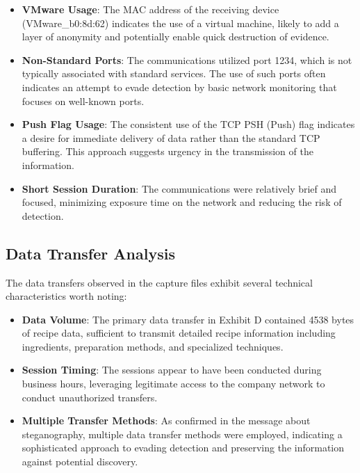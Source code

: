 \begin{itemize}
    \item \textbf{VMware Usage}: The MAC address of the receiving device (VMware\_b0:8d:62) indicates the use of a virtual machine, likely to add a layer of anonymity and potentially enable quick destruction of evidence.
    
    \item \textbf{Non-Standard Ports}: The communications utilized port 1234, which is not typically associated with standard services. The use of such ports often indicates an attempt to evade detection by basic network monitoring that focuses on well-known ports.
    
    \item \textbf{Push Flag Usage}: The consistent use of the TCP PSH (Push) flag indicates a desire for immediate delivery of data rather than the standard TCP buffering. This approach suggests urgency in the transmission of the information.
    
    \item \textbf{Short Session Duration}: The communications were relatively brief and focused, minimizing exposure time on the network and reducing the risk of detection.
\end{itemize}

\subsection{Data Transfer Analysis}
The data transfers observed in the capture files exhibit several technical characteristics worth noting:

\begin{itemize}
    \item \textbf{Data Volume}: The primary data transfer in Exhibit D contained 4538 bytes of recipe data, sufficient to transmit detailed recipe information including ingredients, preparation methods, and specialized techniques.
    
    \item \textbf{Session Timing}: The sessions appear to have been conducted during business hours, leveraging legitimate access to the company network to conduct unauthorized transfers.
    
    \item \textbf{Multiple Transfer Methods}: As confirmed in the message about steganography, multiple data transfer methods were employed, indicating a sophisticated approach to evading detection and preserving the information against potential discovery.
\end{itemize}

